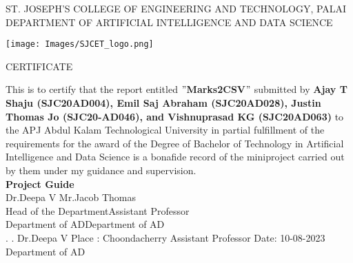 \thispagestyle{empty}
\begin{center}
\normalsize{ST. JOSEPH’S COLLEGE OF ENGINEERING AND TECHNOLOGY, PALAI}\\[0.5cm]
\normalsize
 { DEPARTMENT OF ARTIFICIAL INTELLIGENCE AND DATA SCIENCE}\\[1.0cm]%
   \begin{center}
   \texttt{[image: Images/SJCET\_logo.png]}
   \end{center}
{\large CERTIFICATE}\\[1.5cm]
\end{center}
\normalsize 
This is to certify that the report entitled {\bf $"$Marks2CSV$"$} submitted by { \bf Ajay T Shaju (SJC20AD004), Emil Saj Abraham (SJC20AD028), Justin Thomas Jo (SJC20-AD046), and Vishnuprasad KG (SJC20AD063)} to the APJ Abdul Kalam Technological University in partial fulfillment of the requirements for the award of the Degree of Bachelor of Technology in Artificial Intelligence and Data Science is a bonafide record of the miniproject carried out by them under my guidance and supervision.\vspace{1.3 cm}\\
{\bf Project Guide}\hspace{8.35 cm}{\bf Project Coordinator}\\
Dr.Deepa V\hspace{9.0 cm} Mr.Jacob Thomas\\
Head of the Department\hspace{6.85 cm}Assistant Professor\hspace{2.6 cm}\\Department of AD\hspace{7.9 cm}Department of AD
\vspace{1.3 cm}\\
.\hspace{11.06 cm}{\bf Head of the Department}
\newline
.\hspace{11.01 cm} Dr.Deepa V
\newline
Place : Choondacherry  \hspace{6.87 cm} Assistant Professor
\newline
Date\hspace{0.25 cm}: 10-08-2023 \hspace{7.7 cm} Department of AD      








